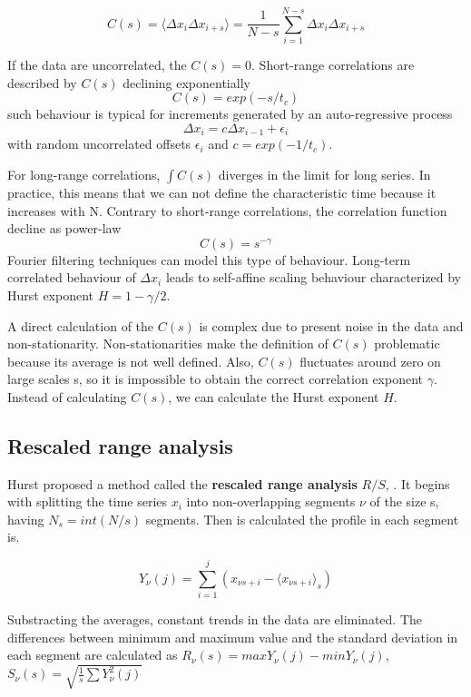 \begin{equation}
C(s) = \langle \Delta x_i \Delta x_{i+s} \rangle = \frac{1}{N-s} \sum_{i=1}^{N-s}\Delta x_i \Delta x_{i+s}
\end{equation}


If the data are uncorrelated, the $C(s)=0$. Short-range correlations are described by $C(s)$ declining exponentially
$$C(s) = exp(-s/t_c)$$
such behaviour is typical for increments generated by an auto-regressive process 
$$ \Delta x_i = c\Delta x_{i-1} + \epsilon_i $$
with random uncorrelated offsets $\epsilon_i$ and $c = exp(-1/t_c)$.

For long-range correlations, $\int C(s)$ diverges in the limit for long series. In practice, this means that we can not define the characteristic time because it increases with N. Contrary to short-range correlations, the correlation function decline as power-law 
$$C(s) = s^{-\gamma}$$
Fourier filtering techniques can model this type of behaviour. Long-term correlated behaviour of $\Delta x_i$ leads to self-affine scaling behaviour characterized by Hurst exponent $H=1-\gamma/2$. 

A direct calculation of the $C(s)$ is complex due to present noise in the data and non-stationarity. Non-stationarities make the definition of $C(s)$ problematic because its average is not well defined. Also, $C(s)$ fluctuates around zero on large scales s, so it is impossible to obtain the correct correlation exponent $\gamma$. Instead of calculating $C(s)$, we can calculate the Hurst exponent $H$.

\subsection{Rescaled range analysis} 

Hurst proposed a method called the \textbf{rescaled range analysis} $R/S$, \cite{hurst1951long}. It begins with splitting the time series $x_i$ into non-overlapping segments $\nu$ of the size s, having $N_s = int(N/s)$ segments. Then is calculated the profile in each segment is. 

$$Y_\nu(j) = \sum_{i=1}^{j} (x_{\nu s +i} - \langle x_{\nu s + i } \rangle _s)$$

Substracting the averages, constant trends in the data are eliminated. The differences between minimum and maximum value and the standard deviation in each segment are calculated as $R_{\nu}(s) = max Y_\nu(j) - min Y_{\nu}(j)$, $S_{\nu}(s) = \sqrt{\frac{1}{s}\sum Y^2_{\nu}(j)}$

